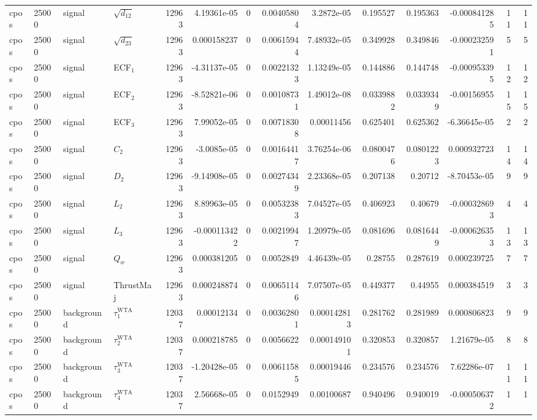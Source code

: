 \begin{landscape}
\begin{longtable}{llll r rrrr rr r rr}
cpos & 25000 & signal & $\sqrt{d_{12}}$ & 12963 & 4.19361e-05 & 0 & 0.00405804 & 3.2872e-05 & 0.195527 & 0.195363 & -0.000841285 & 11 & 11 \\
cpos & 25000 & signal & $\sqrt{d_{23}}$ & 12963 & 0.000158237 & 0 & 0.00615944 & 7.48932e-05 & 0.349928 & 0.349846 & -0.000232591 & 5 & 5 \\
cpos & 25000 & signal & ECF$_1$ & 12963 & -4.31137e-05 & 0 & 0.00221323 & 1.13249e-05 & 0.144886 & 0.144748 & -0.000953395 & 12 & 12 \\
cpos & 25000 & signal & ECF$_2$ & 12963 & -8.52821e-06 & 0 & 0.00108731 & 1.49012e-08 & 0.0339882 & 0.0339349 & -0.00156955 & 15 & 15 \\
cpos & 25000 & signal & ECF$_3$ & 12963 & 7.99052e-05 & 0 & 0.00718308 & 0.00011456 & 0.625401 & 0.625362 & -6.36645e-05 & 2 & 2 \\
cpos & 25000 & signal & $C_2$ & 12963 & -3.0085e-05 & 0 & 0.00164417 & 3.76254e-06 & 0.0800476 & 0.0801223 & 0.000932723 & 14 & 14 \\
cpos & 25000 & signal & $D_2$ & 12963 & -9.14908e-05 & 0 & 0.00274349 & 2.23368e-05 & 0.207138 & 0.20712 & -8.70453e-05 & 9 & 9 \\
cpos & 25000 & signal & $L_2$ & 12963 & 8.89963e-05 & 0 & 0.00532383 & 7.04527e-05 & 0.406923 & 0.40679 & -0.000328693 & 4 & 4 \\
cpos & 25000 & signal & $L_3$ & 12963 & -0.000113422 & 0 & 0.00219947 & 1.20979e-05 & 0.081696 & 0.0816449 & -0.000626353 & 13 & 13 \\
cpos & 25000 & signal & $Q_w$ & 12963 & 0.000381205 & 0 & 0.0052849 & 4.46439e-05 & 0.28755 & 0.287619 & 0.000239725 & 7 & 7 \\
cpos & 25000 & signal & ThrustMaj & 12963 & 0.000248874 & 0 & 0.00651146 & 7.07507e-05 & 0.449377 & 0.44955 & 0.000384519 & 3 & 3 \\
cpos & 25000 & background & $\tau_1^{\mathrm{WTA}}$ & 12037 & 0.00012134 & 0 & 0.00362801 & 0.000142813 & 0.281762 & 0.281989 & 0.000806823 & 9 & 9 \\
cpos & 25000 & background & $\tau_2^{\mathrm{WTA}}$ & 12037 & 0.000218785 & 0 & 0.0056622 & 0.000149101 & 0.320853 & 0.320857 & 1.21679e-05 & 8 & 8 \\
cpos & 25000 & background & $\tau_3^{\mathrm{WTA}}$ & 12037 & -1.20428e-05 & 0 & 0.00611585 & 0.00019446 & 0.234576 & 0.234576 & 7.62286e-07 & 11 & 11 \\
cpos & 25000 & background & $\tau_4^{\mathrm{WTA}}$ & 12037 & 2.56668e-05 & 0 & 0.0152949 & 0.00100687 & 0.940496 & 0.940019 & -0.000506372 & 1 & 1 \\

\end{longtable}
\end{landscape}
